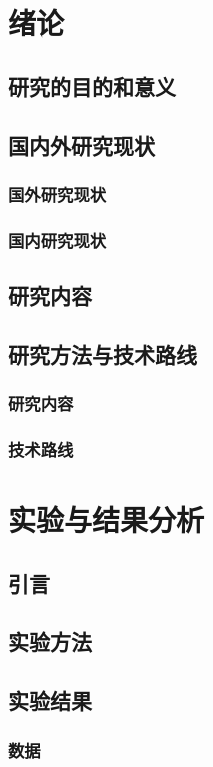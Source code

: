 \documentclass{ctexbook} %
\begin{document}
	\tableofcontents
	\chapter{绪论}
	\section{研究的目的和意义}
	\section{国内外研究现状}
	\subsection{国外研究现状}
	\subsection{国内研究现状}
	\section{研究内容}
	\section{研究方法与技术路线}
	\subsection{研究内容}
	\subsection{技术路线}
	
	\chapter{实验与结果分析}
	\section{引言}
	\section{实验方法}	
	\section{实验结果}	
	\subsection{数据}
\end{document}
